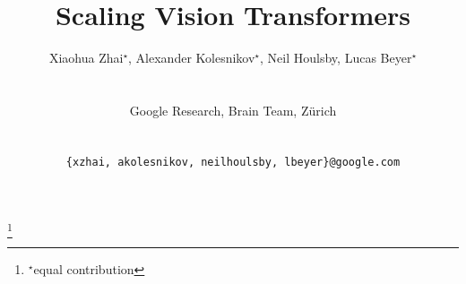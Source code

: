 \documentclass[10pt,twocolumn,letterpaper]{article}
\title{Scaling Vision Transformers}
\author{%
  \centerline{Xiaohua Zhai$^{\star}$, Alexander Kolesnikov$^{\star}$, Neil Houlsby, Lucas Beyer$^{\star}$} \vspace{2mm}\\
  \centerline{Google Research, Brain Team, Zürich} \vspace{1.5mm} \\
  \centerline{\texttt{{\{xzhai, akolesnikov, neilhoulsby, lbeyer\}}@google.com}}
}
\begin{document}
\maketitle
{\let\thefootnote\relax\footnote{
{$^{\star}$equal contribution}}}



{\small


}

\clearpage{}

\end{document}

